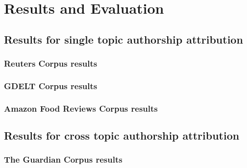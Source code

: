 \chapter{Results and Evaluation}

\section{Results for single topic authorship attribution}
\subsection{Reuters Corpus results}
\subsection{GDELT Corpus results}
\subsection{Amazon Food Reviews Corpus results}

\section{Results for cross topic authorship attribution}
\subsection{The Guardian Corpus results}